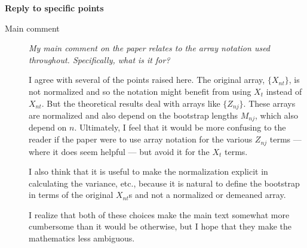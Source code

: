 \documentclass[12pt]{article}
\begin{document}
\newpage

\noindent \textbf{Reply to specific points}

\begin{description}
\item[Main comment] \emph{My main comment on the paper relates to the
    array notation used throughout. Specifically, what is it for?}

  I agree with several of the points raised here. The original array,
  $\{X_{nt}\}$, is not normalized and so the notation might benefit
  from using $X_t$ instead of $X_{nt}$. But the theoretical results
  deal with arrays like $\{Z_{nj}\}$. These arrays are normalized and
  also depend on the bootstrap lengths $M_{nj}$, which also depend on
  $n$. Ultimately, I feel that it would be more confusing to the
  reader if the paper were to use array notation for the various
  $Z_{nj}$ terms --- where it does seem helpful --- but avoid it for
  the $X_t$ terms.

  I also think that it is useful to make the normalization explicit in
  calculating the variance, etc., because it is natural to define the
  bootstrap in terms of the original $X_{nt}$s and not a normalized or
  demeaned array.

  I realize that both of these choices make the main text somewhat
  more cumbersome than it would be otherwise, but I hope that they
  make the mathematics less ambiguous.

\end{description}
\end{document}
